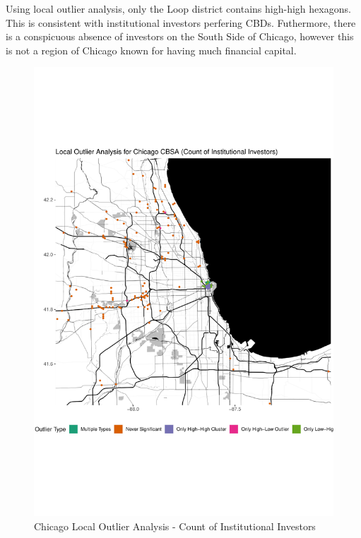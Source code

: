 Using local outlier analysis, only the Loop district contains high-high hexagons. This is consistent with institutional investors perfering CBDs.  Futhermore, there is a conspicuous absence of investors on the South Side of Chicago, however this is not a region of Chicago known for having much financial capital.  
\begin{figure}
	\centering
	\includegraphics[width=1\linewidth]{Figures/ChapterIV/Chi_Count_LO}
	\caption[Chicago CBSA Local Outlier Analysis - Count of Institutional Investors 1999-2018]{Chicago Local Outlier Analysis - Count of Institutional Investors}
	\label{fig:Chicagocountlocaloutliercount}
\end{figure}	

